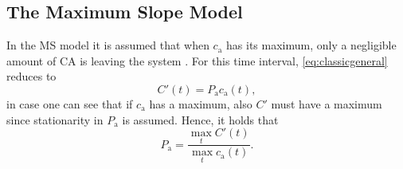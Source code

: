 \documentclass[journal,twocolumn]{IEEEtran}
\newcommand{\ca}{c_\mathrm{a}}
\newcommand{\cout}{c_{\mathrm{v}}}
\newcommand{\Pa}{P_{\mathrm{a}}}
\begin{document}

	
	
	
	\subsection{The Maximum Slope Model}\label{sec:ms}	
	In the MS model it is assumed that when $\ca$ has its maximum, only a negligible amount of CA is leaving the system \cite{klotz99}.
	For this time interval, \eqref{eq:classicgeneral} reduces to 
	\begin{equation}
		C'(t) = \Pa\ca(t),
	\end{equation}
	in case one can see that if $\ca$ has a maximum, also $C'$ must have a maximum since stationarity in $\Pa$ is assumed.
	Hence, it holds that
	\begin{equation}\label{eq:MS}
		\Pa = \frac{\max_{t}C'(t)}{\max_{t}\ca(t)}.
	\end{equation}
	
	
	
\end{document}

